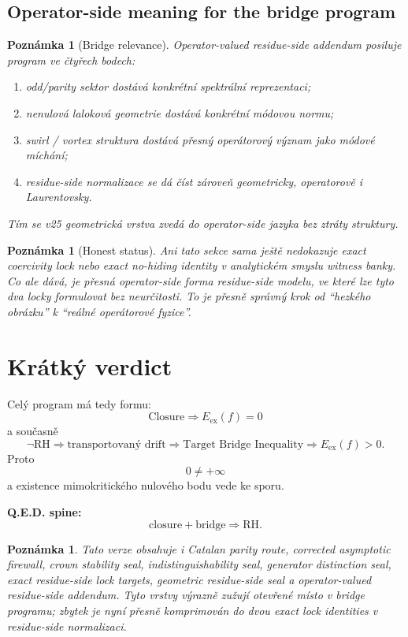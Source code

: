 \documentclass[11pt,a4paper]{article}
\newtheorem{remark}[theorem]{Poznámka}
\begin{document}
\subsection*{Operator-side meaning for the bridge program}

\begin{remark}[Bridge relevance]
Operator-valued residue-side addendum posiluje program ve čtyřech bodech:
\begin{enumerate}[label=\textbf{(\arabic*)}]
    \item odd/parity sektor dostává konkrétní spektrální reprezentaci;
    \item nenulová laloková geometrie dostává konkrétní módovou normu;
    \item swirl / vortex struktura dostává přesný operátorový význam jako módové míchání;
    \item residue-side normalizace se dá číst zároveň geometricky, operatorově i Laurentovsky.
\end{enumerate}
Tím se v25 geometrická vrstva zvedá do operator-side jazyka bez ztráty struktury.
\end{remark}

\begin{remark}[Honest status]
Ani tato sekce sama ještě nedokazuje exact coercivity lock nebo exact no-hiding identity
v analytickém smyslu witness banky.
Co ale dává, je přesná operator-side forma residue-side modelu, ve které lze tyto dva locky
formulovat bez neurčitosti.
To je přesně správný krok od ``hezkého obrázku'' k ``reálné operátorové fyzice''.
\end{remark}


\section{Krátký verdict}

Celý program má tedy formu:
\[
\boxed{
\text{Closure} \Longrightarrow E_{\mathrm{ex}}(f)=0
}
\]
a současně
\[
\boxed{
\neg \mathrm{RH}
\Longrightarrow
\text{transportovaný drift}
\Longrightarrow
\text{Target Bridge Inequality}
\Longrightarrow
E_{\mathrm{ex}}(f)>0.
}
\]
Proto
\[
0\neq +\infty
\]
a existence mimokritického nulového bodu vede ke sporu.

\bigskip

\noindent
\textbf{Q.E.D. spine:}
\[
\text{closure}+\text{bridge}\Longrightarrow \mathrm{RH}.
\]

\begin{remark}
Tato verze obsahuje i Catalan parity route, corrected asymptotic firewall, crown stability seal, indistinguishability seal, generator distinction seal, exact residue-side lock targets, geometric residue-side seal a operator-valued residue-side addendum.
Tyto vrstvy výrazně zužují otevřené místo v bridge programu; zbytek je nyní přesně komprimován do dvou exact lock identities v residue-side normalizaci.
\end{remark}
\end{document}
